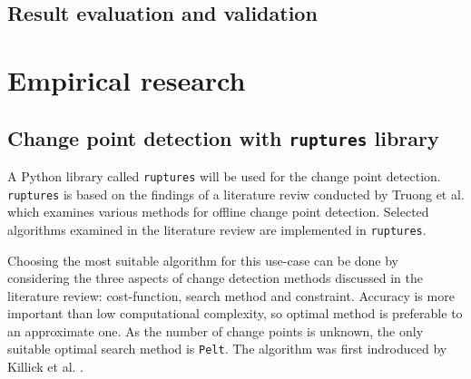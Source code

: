 \subsection{Result evaluation and validation} \label{subsec:validation}







\section{Empirical research} \label{sec:casestudy}

\subsection{Change point detection with \texttt{ruptures} library} \label{subsec:solution}

A Python library called \texttt{ruptures} will be used for the change point detection. \texttt{ruptures} is based on the findings of a literature reviw conducted by Truong et al. \cite{truongSelectiveReviewOffline2020} which examines various methods for offline change point detection. Selected algorithms examined in the literature review are implemented in \texttt{ruptures}.

Choosing the most suitable algorithm %
for this use-case can be done by considering the three aspects of change detection methods discussed in the literature review: cost-function, search method and constraint. Accuracy is more important than low computational complexity, so optimal method is preferable to an approximate one. As the number of change points is unknown, the only suitable optimal search method is \texttt{Pelt}. The algorithm was first indroduced by Killick et al. \cite{killickOptimalDetectionChangepoints2012}.

